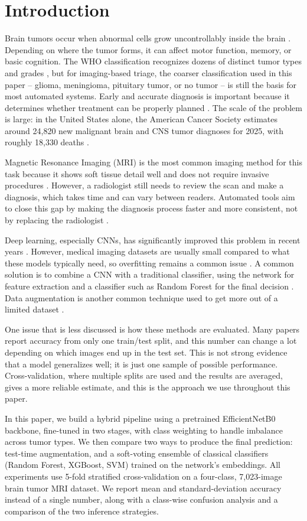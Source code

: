 \documentclass[conference]{IEEEtran}
\begin{document}
\section{Introduction}
Brain tumors occur when abnormal cells grow uncontrollably inside the brain \cite{r16}. Depending on where the tumor forms, it can affect motor function, memory, or basic cognition. The WHO classification recognizes dozens of distinct tumor types and grades \cite{louis2021who}, but for imaging-based triage, the coarser classification used in this paper -- glioma, meningioma, pituitary tumor, or no tumor -- is still the basis for most automated systems. Early and accurate diagnosis is important because it determines whether treatment can be properly planned \cite{r16}. The scale of the problem is large: in the United States alone, the American Cancer Society estimates around 24,820 new malignant brain and CNS tumor diagnoses for 2025, with roughly 18,330 deaths \cite{r4}.

Magnetic Resonance Imaging (MRI) is the most common imaging method for this task because it shows soft tissue detail well and does not require invasive procedures \cite{r16}. However, a radiologist still needs to review the scan and make a diagnosis, which takes time and can vary between readers. Automated tools aim to close this gap by making the diagnosis process faster and more consistent, not by replacing the radiologist \cite{r19}.

Deep learning, especially CNNs, has significantly improved this problem in recent years \cite{r16, r17}. However, medical imaging datasets are usually small compared to what these models typically need, so overfitting remains a common issue \cite{r19}. A common solution is to combine a CNN with a traditional classifier, using the network for feature extraction and a classifier such as Random Forest for the final decision \cite{r18, r20}. Data augmentation is another common technique used to get more out of a limited dataset \cite{r20}.

One issue that is less discussed is how these methods are evaluated. Many papers report accuracy from only one train/test split, and this number can change a lot depending on which images end up in the test set. This is not strong evidence that a model generalizes well; it is just one sample of possible performance. Cross-validation, where multiple splits are used and the results are averaged, gives a more reliable estimate, and this is the approach we use throughout this paper.

In this paper, we build a hybrid pipeline using a pretrained EfficientNetB0 backbone, fine-tuned in two stages, with class weighting to handle imbalance across tumor types. We then compare two ways to produce the final prediction: test-time augmentation, and a soft-voting ensemble of classical classifiers (Random Forest, XGBoost, SVM) trained on the network's embeddings. All experiments use 5-fold stratified cross-validation on a four-class, 7,023-image brain tumor MRI dataset. We report mean and standard-deviation accuracy instead of a single number, along with a class-wise confusion analysis and a comparison of the two inference strategies.
\end{document}
